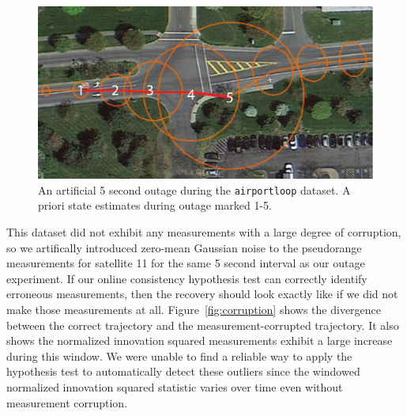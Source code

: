 \begin{figure}[!t]
\includegraphics[width=\columnwidth]{outage}
\caption{An artificial 5 second outage during the \texttt{airportloop} dataset.  A priori state estimates during outage marked 1-5.}
\label{fig:outage}
\end{figure}

This dataset did not exhibit any measurements with a large degree of corruption, so we artifically introduced zero-mean Gaussian noise to the pseudorange measurements for satellite 11 for the same 5 second interval as our outage experiment.  If our online consistency hypothesis test can correctly identify erroneous measurements, then the recovery should look exactly like if we did not make those measurements at all.  Figure~\ref{fig:corruption} shows the divergence between the correct trajectory and the measurement-corrupted trajectory.  It also shows the normalized innovation squared measurements exhibit a large increase during this window.  We were unable to find a reliable way to apply the hypothesis test to automatically detect these outliers since the windowed normalized innovation squared statistic varies over time even without measurement corruption.

